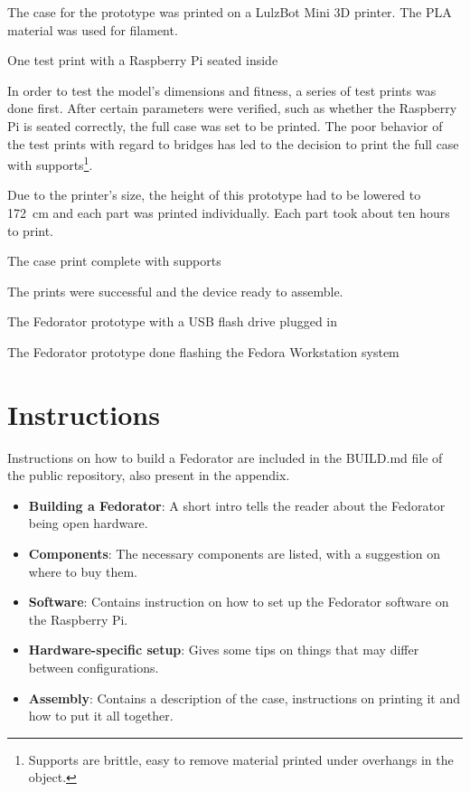         The case for the prototype was printed on a LulzBot Mini \cite{lulzbot-mini} 3D printer.  The PLA material was used for filament.
        
            {One test print with a Raspberry Pi seated inside}
        
        In order to test the model's dimensions and fitness, a series of test prints was done first.  After certain parameters were verified, such as whether the Raspberry Pi is seated correctly, the full case was set to be printed.  The poor behavior of the test prints with regard to bridges has led to the decision to print the full case with supports\footnote{Supports are brittle, easy to remove material printed under overhangs in the object.}.
        
        Due to the printer's size, the height of this prototype had to be lowered to 172~cm and each part was printed individually.  Each part took about ten hours to print.%
        
            {The case print complete with supports}
        
        The prints were successful and the device ready to assemble.
        
        \newpage
        
        
            {The Fedorator prototype with a USB flash drive plugged in}
            
            {The Fedorator prototype done flashing the Fedora Workstation system}
        
        \newpage
        
        
    \section{Instructions}
        Instructions on how to build a Fedorator are included in the BUILD.md file of the public repository, also present in the appendix.
        
        \begin{itemize}
            \item \textbf{Building a Fedorator}: A short intro tells the reader about the Fedorator being open hardware.
            \item \textbf{Components}: The necessary components are listed, with a suggestion on where to buy them.
            \item \textbf{Software}: Contains instruction on how to set up the Fedorator software on the Raspberry Pi.
            \item \textbf{Hardware-specific setup}: Gives some tips on things that may differ between configurations.
            \item \textbf{Assembly}: Contains a description of the case, instructions on printing it and how to put it all together.
        \end{itemize}
        
